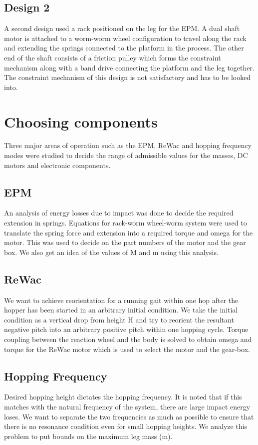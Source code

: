 \documentclass[10pt, compsocconf, conference]{IEEEtran}
\begin{document}
\subsection{Design 2}
A second design used a rack positioned on the leg for the EPM. A dual shaft motor is attached to a worm-worm wheel configuration
to travel along the rack and extending the springs connected to the platform in the process. The other end of the shaft consists of
a friction pulley which forms the constraint mechanism along with a band drive connecting the platform and the leg together. The
constraint mechanism of this design is not satisfactory and has to be looked into.

\section{Choosing components}
Three major areas of operation such as the EPM, ReWac and hopping frequency modes were studied to decide the range of admissible
values for the masses, DC motors and electronic components.
\subsection{EPM}
An analysis of energy losses due to impact was done to decide the required extension in springs. Equations for rack-worm wheel-worm
system were used to translate the spring force and extension into a required torque and omega for the motor. This was used to
decide on the part numbers of the motor and the gear box. We also get an idea of the values of M and m using this analysis.
\subsection{ReWac}
We want to achieve reorientation for a running gait within one hop after the hopper has been started in an arbitrary initial
condition. We take the initial condition as a vertical drop from height H and try to reorient the resultant negative pitch into
an arbitrary positive pitch within one hopping cycle. Torque coupling between the reaction wheel and the body is solved to obtain
omega and torque for the ReWac motor which is used to select the motor and the gear-box.
\subsection{Hopping Frequency}
Desired hopping height dictates the hopping frequency. It is noted that if this matches with the natural frequency of the system,
there are large impact energy loses. We want to separate the two frequencies as much as possible to ensure that there is no resonance
condition even for small hopping heights. We analyze this problem to put bounds on the maximum leg mass (m).\\
\end{document}
